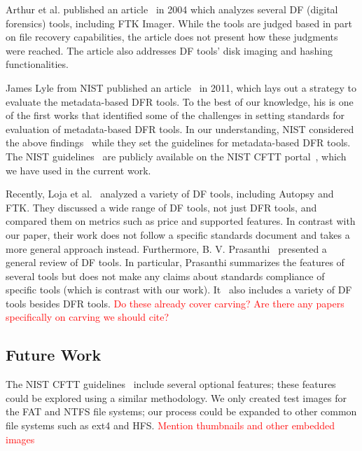 \documentclass{ws-rv9x6}
\newcommand{\TODO}[1]{\textcolor{red}{#1}} %
\newenvironment{paraphrase}{\color{blue}}{\color{black}} %
\begin{document}
\begin{paraphrase}
 Arthur et al. published an article~\cite{arthur2004} in 2004 which analyzes several DF (digital forensics) tools, including FTK Imager.
While the tools are judged based in part on file recovery capabilities, the article does not present how these judgments were reached.
The article also addresses DF tools' disk imaging and hashing functionalities.

James Lyle from NIST published an article~\cite{lyle2011-ICDF2C} in 2011, which lays out a strategy to evaluate the metadata-based DFR tools. To the best of our knowledge, 
his is one of the first works that identified some of the challenges in setting standards for evaluation of metadata-based DFR tools.
In our understanding, NIST considered the above findings~\cite{lyle2011-ICDF2C} while they set the guidelines for metadata-based DFR tools.  
The NIST guidelines~\cite{meta:dfr:standards} are publicly available on the NIST CFTT portal~\cite{cftt:nist}, which we have used in the current work.

Recently, Loja et al.~\cite{loja2016} analyzed a variety of DF tools, including Autopsy and FTK. 
They discussed a wide range of DF tools, not just DFR tools, and compared them on metrics such as price and supported features. 
In contrast with our paper, their work does not follow a specific standards document and takes a more general approach instead.
Furthermore, B. V. Prasanthi~\cite{prasanthi2016} presented a general review of DF tools. 
In particular, Prasanthi summarizes the features of several tools but does not make any claims about standards compliance of specific tools (which is contrast with our work).
It~\cite{prasanthi2016} also includes a variety of DF tools besides DFR tools.
\TODO{Do these already cover carving? Are there any papers specifically on carving we should cite?}
\end{paraphrase}


\subsection{Future Work}
\begin{paraphrase}

The NIST CFTT guidelines~\cite{meta:dfr:standards} include several optional features; these features could be explored using a similar methodology.
We only created test images for the FAT and NTFS file systems; our process could be expanded to other common file systems such as ext4 and HFS.
\end{paraphrase}
\TODO{Mention thumbnails and other embedded images}
\end{document}
